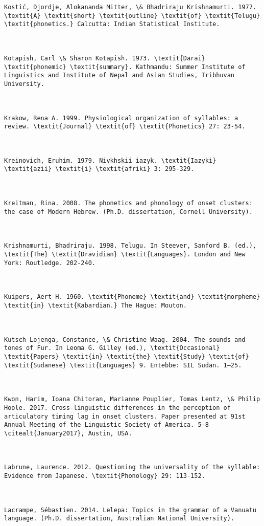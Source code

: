 \begin{verbatim}
Kostić, Djordje, Alokananda Mitter, \& Bhadriraju Krishnamurti. 1977. \textit{A} \textit{short} \textit{outline} \textit{of} \textit{Telugu} \textit{phonetics.} Calcutta: Indian Statistical Institute.



Kotapish, Carl \& Sharon Kotapish. 1973. \textit{Darai} \textit{phonemic} \textit{summary}. Kathmandu: Summer Institute of Linguistics and Institute of Nepal and Asian Studies, Tribhuvan University.



Krakow, Rena A. 1999. Physiological organization of syllables: a review. \textit{Journal} \textit{of} \textit{Phonetics} 27: 23-54.



Kreinovich, Eruhim. 1979. Nivkhskii iazyk. \textit{Iazyki} \textit{azii} \textit{i} \textit{afriki} 3: 295-329.



Kreitman, Rina. 2008. The phonetics and phonology of onset clusters: the case of Modern Hebrew. (Ph.D. dissertation, Cornell University).



Krishnamurti, Bhadriraju. 1998. Telugu. In Steever, Sanford B. (ed.), \textit{The} \textit{Dravidian} \textit{Languages}. London and New York: Routledge. 202-240.



Kuipers, Aert H. 1960. \textit{Phoneme} \textit{and} \textit{morpheme} \textit{in} \textit{Kabardian.} The Hague: Mouton.



Kutsch Lojenga, Constance, \& Christine Waag. 2004. The sounds and tones of Fur. In Leoma G. Gilley (ed.), \textit{Occasional} \textit{Papers} \textit{in} \textit{the} \textit{Study} \textit{of} \textit{Sudanese} \textit{Languages} 9. Entebbe: SIL Sudan. 1–25.



Kwon, Harim, Ioana Chitoran, Marianne Pouplier, Tomas Lentz, \& Philip Hoole. 2017. Cross-linguistic differences in the perception of articulatory timing lag in onset clusters. Paper presented at 91st Annual Meeting of the Linguistic Society of America. 5-8 \citealt{January2017}, Austin, USA.



Labrune, Laurence. 2012. Questioning the universality of the syllable: Evidence from Japanese. \textit{Phonology} 29: 113-152.



Lacrampe, Sébastien. 2014. Lelepa: Topics in the grammar of a Vanuatu language. (Ph.D. dissertation, Australian National University).




\end{verbatim}
